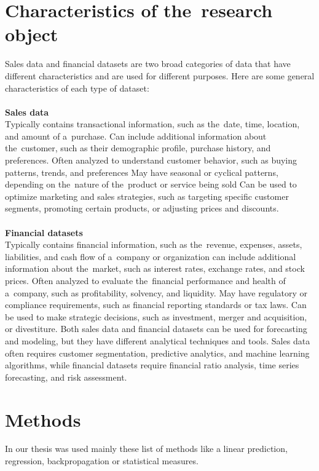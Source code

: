     \section{Characteristics of the~research object}\label{subsec:research_object}
    Sales data and financial datasets are two broad categories of data that have different characteristics and are used
    for different purposes. Here are some general characteristics of each type of dataset:\\
    \\
    \textbf{Sales data}\\
    Typically contains transactional information, such as the~date, time, location, and amount of a~purchase. Can include additional information about the~customer, such as their demographic profile, purchase history, and
    preferences. Often analyzed to understand customer behavior, such as buying patterns, trends, and preferences
    May have seasonal or cyclical patterns, depending on the~nature of the~product or service being sold
    Can be used to optimize marketing and sales strategies, such as targeting specific customer segments, promoting
    certain products, or adjusting prices and discounts.\\
    \\
    \textbf{Financial datasets}\\
    Typically contains financial information, such as the~revenue, expenses, assets, liabilities, and cash
    flow of a~company or organization can include additional information about the~market, such as interest rates,
    exchange rates, and stock prices. Often analyzed to evaluate the~financial performance and health of a~company,
    such as profitability, solvency, and liquidity. May have regulatory or compliance requirements, such as financial
    reporting standards or tax laws. Can be used to make strategic decisions, such as investment, merger and
    acquisition, or divestiture. Both sales data and financial datasets can be used for forecasting and modeling,
    but they have different analytical techniques and tools. Sales data often requires customer segmentation,
    predictive analytics, and machine learning algorithms, while financial datasets require financial ratio analysis,
    time series forecasting, and risk assessment.
    \section{Methods}\label{subsec:methods}
    In our thesis was used mainly these list of methods like a linear prediction, regression, backpropagation or statistical  measures.
